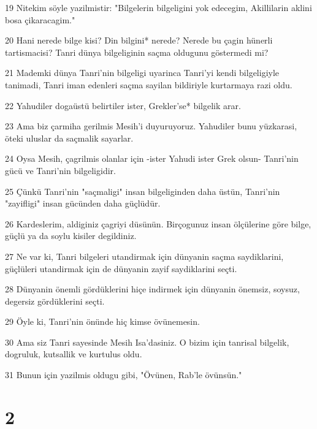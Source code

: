 \par 19 Nitekim söyle yazilmistir: "Bilgelerin bilgeligini yok edecegim, Akillilarin aklini bosa çikaracagim."
\par 20 Hani nerede bilge kisi? Din bilgini* nerede? Nerede bu çagin hünerli tartismacisi? Tanri dünya bilgeliginin saçma oldugunu göstermedi mi?
\par 21 Mademki dünya Tanri'nin bilgeligi uyarinca Tanri'yi kendi bilgeligiyle tanimadi, Tanri iman edenleri saçma sayilan bildiriyle kurtarmaya razi oldu.
\par 22 Yahudiler dogaüstü belirtiler ister, Grekler'se* bilgelik arar.
\par 23 Ama biz çarmiha gerilmis Mesih'i duyuruyoruz. Yahudiler bunu yüzkarasi, öteki uluslar da saçmalik sayarlar.
\par 24 Oysa Mesih, çagrilmis olanlar için -ister Yahudi ister Grek olsun- Tanri'nin gücü ve Tanri'nin bilgeligidir.
\par 25 Çünkü Tanri'nin "saçmaligi" insan bilgeliginden daha üstün, Tanri'nin "zayifligi" insan gücünden daha güçlüdür.
\par 26 Kardeslerim, aldiginiz çagriyi düsünün. Birçogunuz insan ölçülerine göre bilge, güçlü ya da soylu kisiler degildiniz.
\par 27 Ne var ki, Tanri bilgeleri utandirmak için dünyanin saçma saydiklarini, güçlüleri utandirmak için de dünyanin zayif saydiklarini seçti.
\par 28 Dünyanin önemli gördüklerini hiçe indirmek için dünyanin önemsiz, soysuz, degersiz gördüklerini seçti.
\par 29 Öyle ki, Tanri'nin önünde hiç kimse övünemesin.
\par 30 Ama siz Tanri sayesinde Mesih Isa'dasiniz. O bizim için tanrisal bilgelik, dogruluk, kutsallik ve kurtulus oldu.
\par 31 Bunun için yazilmis oldugu gibi, "Övünen, Rab'le övünsün."

\chapter{2}

